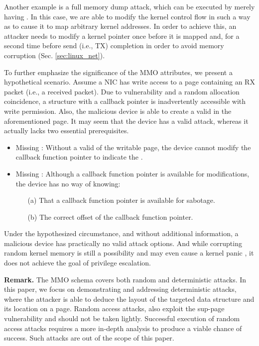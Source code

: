 Another example is a full memory dump attack, which can be executed by merely having \oportunity. In this case, we are able to modify the kernel control flow in such a way as to cause it to map arbitrary kernel addresses. In order to achieve this, an attacker needs to modify a kernel pointer once before it is mapped and, for a second time before send (i.e., TX) completion in order to avoid memory corruption (Sec. \ref{sec:linux_net}). 

To further emphasize the significance of the MMO attributes, we present a hypothetical scenario. Assume a NIC has write access to a page containing an RX packet (i.e., a received packet). Due to \subpage{} vulnerability and a random allocation coincidence, a structure with a callback pointer is inadvertently accessible with write permission. Also, the malicious device is able to create a valid \mabaf{} in the aforementioned page. It may seem that the device has a valid attack, whereas it actually lacks two essential prerequisites.

\begin{itemize}
    \item Missing \means: Without a valid \kva{} of the writable page, the device cannot modify the callback function pointer to indicate the \mabaf.
    \item Missing \oportunity: Although a callback function pointer is available for modifications, the device has no way of knowing: 
    \begin{enumerate}
        \item[(a)] That a callback function pointer is available for sabotage.
        \item[(b)] The correct offset of the callback function pointer.
    \end{enumerate}
\end{itemize}

Under the hypothesized circumstance, and without additional information, a malicious device has practically no valid attack options. 
And while corrupting random kernel memory is still a possibility and may even cause a kernel panic \cite{MMT16}, it does not achieve the goal of privilege escalation.


\smallskip
\noindent\textbf{Remark.} The MMO schema covers both random and deterministic attacks. In this paper, we focus on demonstrating and addressing deterministic attacks, where the attacker is able to deduce the layout of the targeted data structure and its location on a page. Random access attacks, also exploit the sup-page vulnerability and should not be taken lightly. Successful execution of random access attacks requires a more in-depth analysis to produce a viable chance of success. Such attacks are out of the scope of this paper. 

